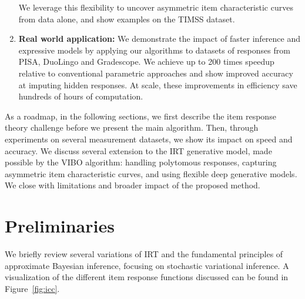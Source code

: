 \begin{enumerate}
    We leverage this flexibility to uncover asymmetric item characteristic curves from data alone, and show examples on the TIMSS dataset.
    \item \textbf{Real world application: } We demonstrate the impact of faster inference and expressive models by applying our algorithms to datasets of responses from PISA, DuoLingo and Gradescope. We achieve up to 200 times speedup relative to conventional parametric approaches and show improved accuracy at imputing hidden responses.
    At scale, these improvements in efficiency save hundreds of hours of computation.
\end{enumerate}

As a roadmap, in the following sections, we first describe the item response theory challenge before we present the main algorithm. Then, through experiments on several measurement datasets, we show its impact on speed and accuracy.
We discuss several extension to the IRT generative model, made possible by the VIBO algorithm: handling polytomous responses, capturing asymmetric item characteristic curves, and using flexible deep generative models. We close with limitations and broader impact of the proposed method.

\section{Preliminaries}
\label{sec:background}

We briefly review several variations of IRT and the fundamental principles of approximate Bayesian inference, focusing on stochastic variational inference.
A visualization of the different item response functions discussed can be found in Figure~\ref{fig:icc}.


